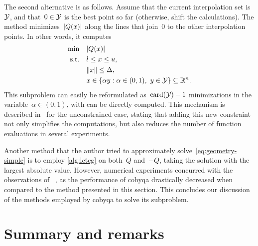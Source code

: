 The second alternative is as follows.
Assume that the current interpolation set is~$\xpt$, and that~$0 \in \xpt$ is the best point so far (otherwise, shift the calculations).
The method minimizes~$\abs{Q(\iter)}$ along the lines that join~$0$ to the other interpolation points.
In other words, it computes
\begin{align*}
    \min        & \quad \abs{Q(\iter)}\\
    \text{s.t.} & \quad \xl \le \iter \le \xu,\\
                & \quad \norm{\iter} \le \rad,\\
                & \quad \iter \in \set{\alpha y : \alpha \in (0, 1), ~ y \in \xpt} \subseteq \R^n.
\end{align*}
This subproblem can easily be reformulated as~$\card(\xpt) - 1$ minimizations in the variable~$\alpha \in (0, 1)$, with can be directly computed.
This mechanism is described in~\cite{Powell_2008} for the unconstrained case, stating that adding this new constraint not only simplifies the computations, but also reduces the number of function evaluations in several experiments.

Another method that the author tried to approximately solve~\cref{eq:geometry-simple} is to employ \cref{alg:lctcg} on both~$Q$ and~$-Q$, taking the solution with the largest absolute value.
However, numerical experiments concurred with the observations of \citeauthor{Powell_2008}~\cite{Powell_2008}, as the performance of \gls{cobyqa} drastically decreased when compared to the method presented in this section.
This concludes our discussion of the methods employed by \gls{cobyqa} to solve its subproblem.

\section{Summary and remarks}

